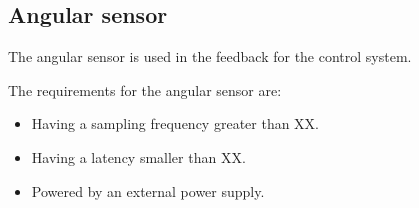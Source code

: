 
\subsection{Angular sensor}
The angular sensor is used in the feedback for the control system.

The requirements for the angular sensor are:
\begin{itemize}
\item Having a sampling frequency greater than XX. 
\item Having a latency smaller than XX. 
\item Powered by an external power supply.
\end{itemize}


%
%
%
%
%
%
%



